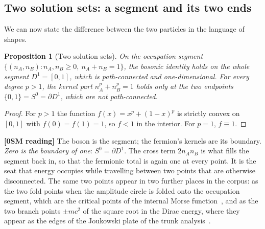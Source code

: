 \documentclass[%
 reprint, amsmath,amssymb, aps, prb, ]{revtex4-2}
\numberwithin{equation}{section}
\newtheorem{proposition}[theorem]{Proposition}
\begin{document}
\subsection{Two solution sets: a segment and its two ends}

We can now state the difference between the two particles in the language of shapes.

\begin{proposition}[Two solution sets]
\label{prop:sets}
On the occupation segment $\{(n_A,n_B):n_A,n_B\ge0,\ n_A+n_B=1\}$, the bosonic identity holds on the whole segment $D^1=[0,1]$, which is path-connected and one-dimensional. For every degree $p>1$, the kernel part $n_A^p+n_B^p=1$ holds only at the two endpoints $\{0,1\}=S^0=\partial D^1$, which are not path-connected.
\end{proposition}

\begin{proof}
For $p>1$ the function $f(x)=x^p+(1-x)^p$ is strictly convex on $[0,1]$ with $f(0)=f(1)=1$, so $f<1$ in the interior. For $p=1$, $f\equiv1$.
\end{proof}

\textbf{[0SM reading]} The boson is the segment; the fermion's kernels are its boundary. \emph{Zero is the boundary of one}: $S^0=\partial D^1$. The cross term $2n_An_B$ is what fills the segment back in, so that the fermionic total is again one at every point. It is the seat that energy occupies while travelling between two points that are otherwise disconnected. The same two points appear in two further places in the corpus: as the two fold points when the amplitude circle is folded onto the occupation segment, which are the critical points of the internal Morse function~\cite{ref:milnor}, and as the two branch points $\pm mc^2$ of the square root in the Dirac energy, where they appear as the edges of the Joukowski plate of the trunk analysis~\cite{ref:trunks}.
\end{document}
